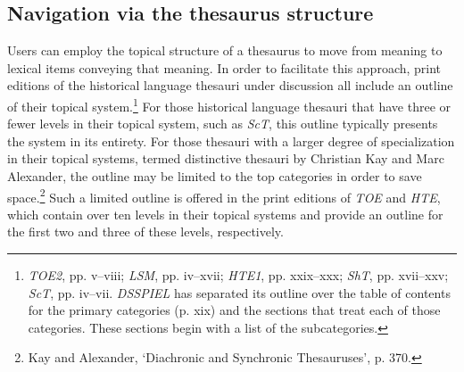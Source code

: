 \subsection{Navigation via the thesaurus structure}
Users can employ the topical structure of a thesaurus to move from meaning to lexical items conveying that meaning. In order to facilitate this approach, print editions of the historical language thesauri under discussion all include an outline of their topical system.\footnote{\textit{TOE2}, pp. v–viii; \textit{LSM}, pp. iv–xvii; \textit{HTE1}, pp. xxix–xxx; \textit{ShT}, pp. xvii–xxv; \textit{ScT}, pp. iv–vii.
\textit{DSSPIEL} has separated its outline over the table of contents for the primary categories (p. xix) and the sections that treat each of those categories. These sections begin with a list of the subcategories.} For those historical language thesauri that %
have three or fewer levels in their topical system, such as \textit{ScT}, this outline typically presents the system in its entirety. For those thesauri with a larger degree of specialization in their topical systems, termed distinctive thesauri by Christian Kay and Marc Alexander, the outline may be limited to the top categories in order to save space.\footnote{Kay and Alexander, `Diachronic and Synchronic Thesauruses', p. 370.} Such a limited outline is offered in the print editions of \textit{TOE} and \textit{HTE}, which contain over ten levels in their topical systems and provide an outline for the first two and three of these levels, respectively.

